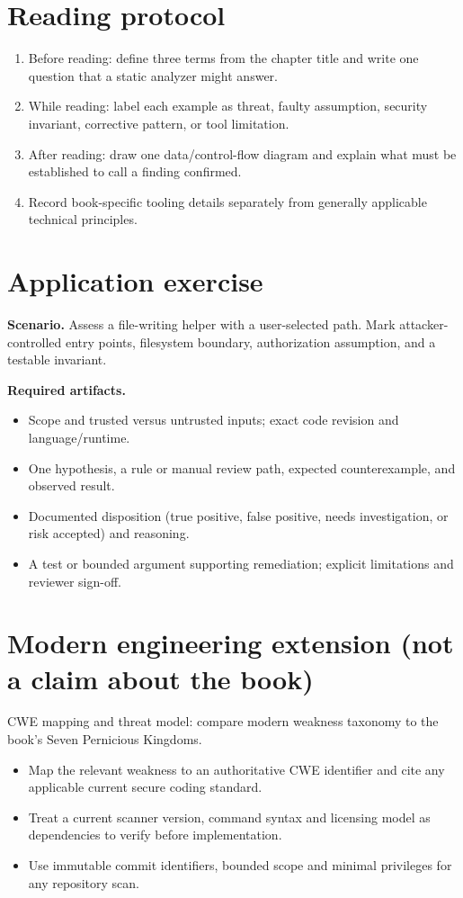 \documentclass[10pt,letterpaper]{article}
\begin{document}
\section{Reading protocol}
\begin{enumerate}
\item Before reading: define three terms from the chapter title and write one question that a static analyzer might answer.
\item While reading: label each example as threat, faulty assumption, security invariant, corrective pattern, or tool limitation.
\item After reading: draw one data/control-flow diagram and explain what must be established to call a finding confirmed.
\item Record book-specific tooling details separately from generally applicable technical principles.
\end{enumerate}

\section{Application exercise}
\textbf{Scenario.} Assess a file-writing helper with a user-selected path. Mark attacker-controlled entry points, filesystem boundary, authorization assumption, and a testable invariant.

\textbf{Required artifacts.}\begin{itemize}
\item Scope and trusted versus untrusted inputs; exact code revision and language/runtime.
\item One hypothesis, a rule or manual review path, expected counterexample, and observed result.
\item Documented disposition (true positive, false positive, needs investigation, or risk accepted) and reasoning.
\item A test or bounded argument supporting remediation; explicit limitations and reviewer sign-off.
\end{itemize}

\section{Modern engineering extension (not a claim about the book)}
CWE mapping and threat model: compare modern weakness taxonomy to the book's Seven Pernicious Kingdoms.

\begin{itemize}
\item Map the relevant weakness to an authoritative CWE identifier and cite any applicable current secure coding standard.
\item Treat a current scanner version, command syntax and licensing model as dependencies to verify before implementation.
\item Use immutable commit identifiers, bounded scope and minimal privileges for any repository scan.
\end{itemize}
\end{document}
